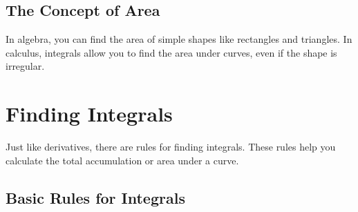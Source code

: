 \subsection{The Concept of Area}
In algebra, you can find the area of simple shapes like rectangles and triangles. In calculus, integrals allow you to find the area under curves, even if the shape is irregular.

\section{Finding Integrals}
Just like derivatives, there are rules for finding integrals. These rules help you calculate the total accumulation or area under a curve.

\subsection{Basic Rules for Integrals}
